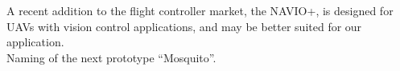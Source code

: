 A recent addition to the flight controller market, the NAVIO+\cite{ref:navio}, is designed for UAVs with vision control applications, and may be better suited for our application.\\
 
Naming of the next prototype ``Mosquito''.
